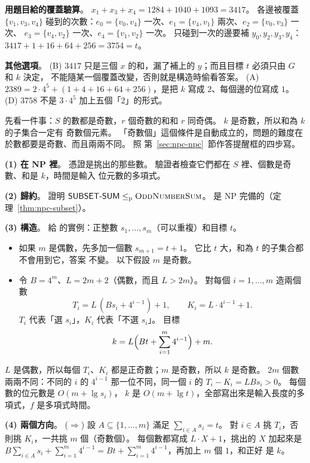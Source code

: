 \textbf{用題目給的覆蓋驗算}。 $x_1 + x_3 + x_4 = 1284 + 1040 + 1093 = 3417$。 各邊被覆蓋 $\{v_1, v_3,
v_4\}$ 碰到的次數：$e_0 = \{v_0, v_4\}$ 一次、$e_1 = \{v_4, v_1\}$ 兩次、$e_2 = \{v_0, v_3\}$ 一次、
$e_3 = \{v_4, v_2\}$ 一次、$e_4 = \{v_1, v_2\}$ 一次。 只碰到一次的邊要補 $y_0, y_2, y_3, y_4$：
$3417 + 1 + 16 + 64 + 256 = 3754 = t$。

\textbf{其他選項}。 (B) $3417$ 只是三個 $x$ 的和，漏了補上的 $y$；而且目標 $t$ 必須只由 $G$ 和 $k$ 決定，
不能隨某一個覆蓋改變，否則就是構造時偷看答案。 (A) $2389 = 2 \cdot 4^5 + (1 + 4 + 16 + 64 + 256)$，是把
$k$ 寫成 $2$、每個邊的位寫成 $1$。 (D) $3758$ 不是 $3 \cdot 4^5$ 加上五個「$2$」的形式。

先看一件事：$S$ 的數都是奇數，$r$ 個奇數的和和 $r$ 同奇偶。 $k$ 是奇數，所以和為 $k$ 的子集合一定有
奇數個元素。 「奇數個」這個條件是自動成立的，問題的難度在於數都要是奇數、而且兩兩不同。 照
第~\ref{sec:npc-npc}~節作答提醒框的四步寫。

\textbf{(1) 在 NP 裡}。 憑證是挑出的那些數。 驗證者檢查它們都在 $S$ 裡、個數是奇數、和是 $k$，時間是輸入
位元數的多項式。

\textbf{(2) 歸約}。 證明 $\textsf{SUBSET-SUM} \le_{\mathrm{p}} \textsc{OddNumberSum}$。  是 NP
完備的（定理~\ref{thm:npc-subset}）。

\textbf{(3) 構造}。 給  的實例：正整數 $s_1, \ldots, s_m$（可以重複）和目標 $t$。
\begin{itemize}
\item 如果 $m$ 是偶數，先多加一個數 $s_{m+1} = t + 1$。 它比 $t$ 大，和為 $t$ 的子集合都不會用到它，答案
不變。 以下假設 $m$ 是奇數。
\item 令 $B = 4^m$、$L = 2m + 2$（偶數，而且 $L > 2m$）。 對每個 $i = 1, \ldots, m$ 造兩個數
\[
T_i = L\,(B s_i + 4^{i-1}) + 1, \qquad K_i = L \cdot 4^{i-1} + 1.
\]
$T_i$ 代表「選 $s_i$」，$K_i$ 代表「不選 $s_i$」。 目標
\[
k = L\Bigl(B t + \sum_{i=1}^{m} 4^{i-1}\Bigr) + m.
\]
\end{itemize}
$L$ 是偶數，所以每個 $T_i$、$K_i$ 都是正奇數；$m$ 是奇數，所以 $k$ 是奇數。 $2m$ 個數兩兩不同：不同的
$i$ 的 $4^{i-1}$ 那一位不同，同一個 $i$ 的 $T_i - K_i = L B s_i > 0$。 每個數的位元數是 $O(m + \lg s_i)$，
$k$ 是 $O(m + \lg t)$，全部寫出來是輸入長度的多項式，$f$ 是多項式時間。

\textbf{(4) 兩個方向}。
($\Rightarrow$) 設 $A \subseteq \{1, \ldots, m\}$ 滿足 $\sum_{i \in A} s_i = t$。 對 $i \in A$ 挑
$T_i$，否則挑 $K_i$，一共挑 $m$ 個（奇數個）。 每個數都寫成 $L \cdot X + 1$，挑出的 $X$ 加起來是
$B \sum_{i \in A} s_i + \sum_{i=1}^{m} 4^{i-1} = Bt + \sum_{i=1}^{m} 4^{i-1}$，再加上 $m$ 個 $1$，和正好
是 $k$。

